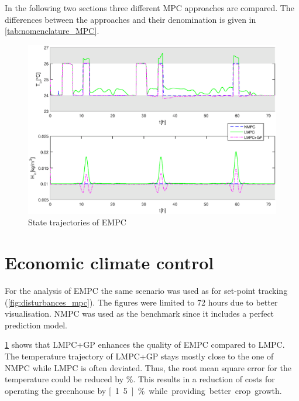 In the following two sections three different MPC approaches are compared.
The differences between the approaches and their denomination is given in \cref{tab:nomenclature_MPC}.

\begin{figure}[t]
\begin{center}
	\includegraphics[width=\textwidth]{../Figures/economic_states.eps}
	\caption{State trajectories of EMPC}
	\label{fig:economic_states}
\end{center}
\end{figure}


\section{Economic climate control}
\label{sec:ecc}

For the analysis of EMPC the same scenario was used as for set-point tracking (\cref{fig:disturbances_mpc}).
The figures were limited to 72 hours due to better visualisation.
NMPC was used as the benchmark since it includes a perfect prediction model.\par\medskip

\cref{fig:economic_states} shows that LMPC+GP enhances the quality of EMPC compared to LMPC.
The temperature trajectory of LMPC+GP stays mostly close to the one of NMPC while LMPC is often deviated.
Thus, the root mean square error for the temperature could be reduced by \unit[47]{\%}.
This results in a reduction of costs for operating the greenhouse by \unit[1.5]{\%} while providing better crop growth.

